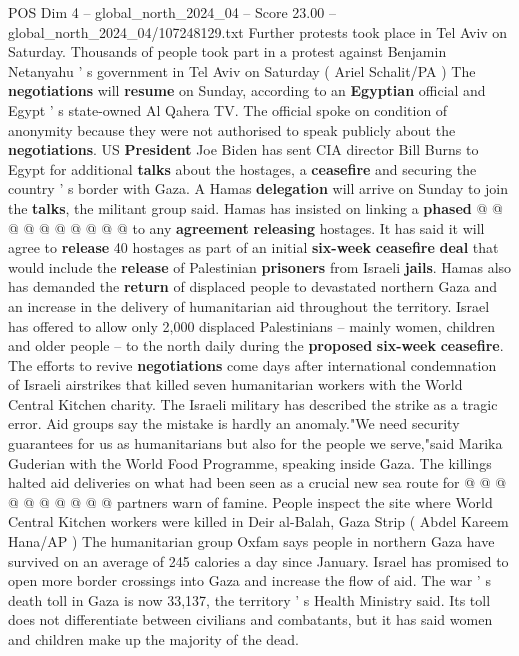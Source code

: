 \begin{textsample}{POS Dim 4 – global\_north\_2024\_04 – Score 23.00 – global\_north\_2024\_04/107248129.txt}
Further protests took place in Tel Aviv on Saturday.
Thousands of people took part in a protest against Benjamin Netanyahu ' s government in Tel Aviv on Saturday ( Ariel Schalit/PA ) The \textbf{negotiations} will \textbf{resume} on Sunday, according to an \textbf{Egyptian} official and Egypt ' s state-owned Al Qahera TV.
The official spoke on condition of anonymity because they were not authorised to speak publicly about the \textbf{negotiations}.
US \textbf{President} Joe Biden has sent CIA director Bill Burns to Egypt for additional \textbf{talks} about the hostages, a \textbf{ceasefire} and securing the country ' s border with Gaza.
A Hamas \textbf{delegation} will arrive on Sunday to join the \textbf{talks}, the militant group said.
Hamas has insisted on linking a \textbf{phased} @ @ @ @ @ @ @ @ @ @ to any \textbf{agreement} \textbf{releasing} hostages.
It has said it will agree to \textbf{release} 40 hostages as part of an initial \textbf{six-week} \textbf{ceasefire} \textbf{deal} that would include the \textbf{release} of Palestinian \textbf{prisoners} from Israeli \textbf{jails}.
Hamas also has demanded the \textbf{return} of displaced people to devastated northern Gaza and an increase in the delivery of humanitarian aid throughout the territory.
Israel has offered to allow only 2,000 displaced Palestinians -- mainly women, children and older people -- to the north daily during the \textbf{proposed} \textbf{six-week} \textbf{ceasefire}.
The efforts to revive \textbf{negotiations} come days after international condemnation of Israeli airstrikes that killed seven humanitarian workers with the World Central Kitchen charity.
The Israeli military has described the strike as a tragic error.
Aid groups say the mistake is hardly an anomaly."We need security guarantees for us as humanitarians but also for the people we serve,"said Marika Guderian with the World Food Programme, speaking inside Gaza.
The killings halted aid deliveries on what had been seen as a crucial new sea route for @ @ @ @ @ @ @ @ @ @ partners warn of famine.
People inspect the site where World Central Kitchen workers were killed in Deir al-Balah, Gaza Strip ( Abdel Kareem Hana/AP ) The humanitarian group Oxfam says people in northern Gaza have survived on an average of 245 calories a day since January.
Israel has promised to open more border crossings into Gaza and increase the flow of aid.
The war ' s death toll in Gaza is now 33,137, the territory ' s Health Ministry said.
Its toll does not differentiate between civilians and combatants, but it has said women and children make up the majority of the dead.

\end{textsample}
